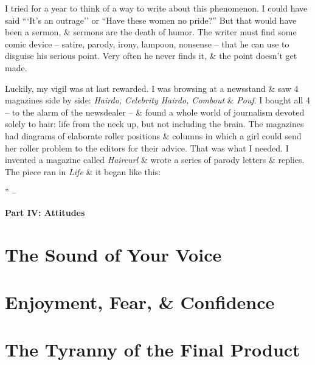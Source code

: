 \documentclass{article}
\numberwithin{equation}{section}
\begin{document}
I tried for a year to think of a way to write about this phenomenon. I could have said ```It's an outrage'' or ``Have these women no pride?'' But that would have been a sermon, \& sermons are the death of humor. The writer must find some comic device -- satire, parody, irony, lampoon, nonsense -- that he can use to disguise his serious point. Very often he never finds it, \& the point doesn't get made.

Luckily, my vigil was at last rewarded. I was browsing at a newsstand \& saw 4 magazines side by side: \textit{Hairdo, Celebrity Hairdo, Combout} \& \textit{Pouf}. I bought all 4 -- to the alarm of the newsdealer -- \& found a whole world of journalism devoted solely to hair: life from the neck up, but not including the brain. The magazines had diagrams of elaborate roller positions \& columns in which a girl could send her roller problem to the editors for their advice. That was what I needed. I invented a magazine called \textit{Haircurl} \& wrote a series of parody letters \& replies. The piece ran in \textit{Life} \& it began like this:

'' -- \cite[pp. 195--]{Zinsser2016}


\begin{center}\LARGE\sf
	\textbf{Part IV: Attitudes}
\end{center}

\section{The Sound of Your Voice}


\section{Enjoyment, Fear, \& Confidence}


\section{The Tyranny of the Final Product}

\end{document}
